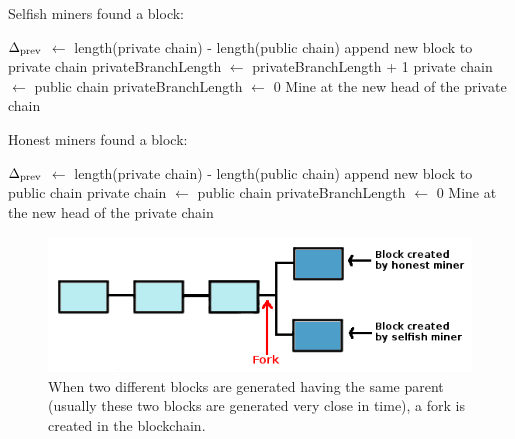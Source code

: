 \documentclass{article}
\begin{document}
\begin{algorithm}
\caption{Selfish miners found a block:}\label{sm_block}
\begin{algorithmic}[1]
\State $\Delta\textsubscript{prev}$ $\gets$ length(private chain) - length(public chain)
\State append new block to private chain
\State privateBranchLength $\gets$ privateBranchLength + 1
\State private chain $\gets$ public chain
\State privateBranchLength $\gets$ 0
\EndIf 
\State Mine at the new head of the private chain 
\end{algorithmic}
\end{algorithm}

\begin{algorithm}
\caption{Honest miners found a block:}\label{sm_others}
\begin{algorithmic}[1]
\State $\Delta\textsubscript{prev}$ $\gets$ length(private chain) - length(public chain)
\State append new block to public chain
\State private chain $\gets$ public chain
\State privateBranchLength $\gets$ 0
\Else 
{} 
\EndIf 
\State Mine at the new head of the private chain 
\end{algorithmic}
\end{algorithm}

\begin{figure}
\centerline{\includegraphics[scale=0.41]{fork}}
\caption{When two different blocks are generated having the same parent (usually these two blocks are generated very close in time), a fork is created in the blockchain.}
\label{fig:fork}
\end{figure}
\end{document}
